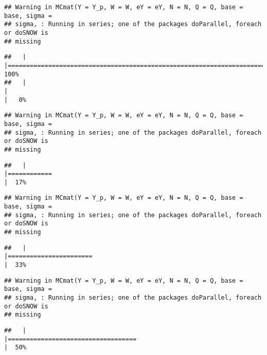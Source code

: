 \documentclass[]{article}
\begin{document}
\begin{verbatim}
## Warning in MCmat(Y = Y_p, W = W, eY = eY, N = N, Q = Q, base = base, sigma =
## sigma, : Running in series; one of the packages doParallel, foreach or doSNOW is
## missing
\end{verbatim}

\begin{verbatim}
##   |                                                                              |======================================================================| 100%
##   |                                                                              |                                                                      |   0%
\end{verbatim}

\begin{verbatim}
## Warning in MCmat(Y = Y_p, W = W, eY = eY, N = N, Q = Q, base = base, sigma =
## sigma, : Running in series; one of the packages doParallel, foreach or doSNOW is
## missing
\end{verbatim}

\begin{verbatim}
##   |                                                                              |============                                                          |  17%
\end{verbatim}

\begin{verbatim}
## Warning in MCmat(Y = Y_p, W = W, eY = eY, N = N, Q = Q, base = base, sigma =
## sigma, : Running in series; one of the packages doParallel, foreach or doSNOW is
## missing
\end{verbatim}

\begin{verbatim}
##   |                                                                              |=======================                                               |  33%
\end{verbatim}

\begin{verbatim}
## Warning in MCmat(Y = Y_p, W = W, eY = eY, N = N, Q = Q, base = base, sigma =
## sigma, : Running in series; one of the packages doParallel, foreach or doSNOW is
## missing
\end{verbatim}

\begin{verbatim}
##   |                                                                              |===================================                                   |  50%
\end{verbatim}
\end{document}
